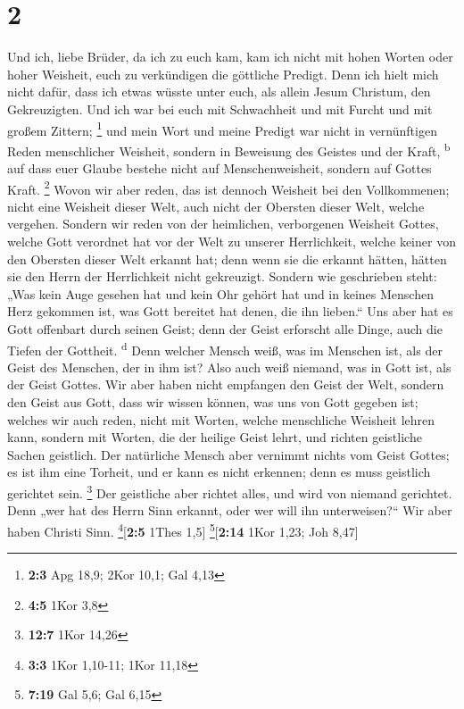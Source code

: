 \hypertarget{section-1}{%
\section{2}\label{section-1}}

 Und ich, liebe Brüder, da ich zu euch kam, kam ich nicht
mit hohen Worten oder hoher Weisheit, euch zu verkündigen die göttliche
Predigt.  Denn ich hielt mich nicht dafür, dass ich etwas
wüsste unter euch, als allein Jesum Christum, den Gekreuzigten.
 Und ich war bei euch mit Schwachheit und mit Furcht und
mit großem Zittern; \footnote{\textbf{2:3} Apg 18,9; 2Kor 10,1; Gal 4,13}
 und mein Wort und meine Predigt war nicht in vernünftigen
Reden menschlicher Weisheit, sondern in Beweisung des Geistes und der
Kraft, \textsuperscript{b}  auf dass euer Glaube bestehe
nicht auf Menschenweisheit, sondern auf Gottes Kraft. \footnote{\textbf{4:5}
  1Kor 3,8}  Wovon wir aber reden, das ist dennoch
Weisheit bei den Vollkommenen; nicht eine Weisheit dieser Welt, auch
nicht der Obersten dieser Welt, welche vergehen.  Sondern
wir reden von der heimlichen, verborgenen Weisheit Gottes, welche Gott
verordnet hat vor der Welt zu unserer Herrlichkeit, 
welche keiner von den Obersten dieser Welt erkannt hat; denn wenn sie
die erkannt hätten, hätten sie den Herrn der Herrlichkeit nicht
gekreuzigt.  Sondern wie geschrieben steht: „Was kein Auge
gesehen hat und kein Ohr gehört hat und in keines Menschen Herz gekommen
ist, was Gott bereitet hat denen, die ihn lieben.``  Uns
aber hat es Gott offenbart durch seinen Geist; denn der Geist erforscht
alle Dinge, auch die Tiefen der Gottheit. \textsuperscript{d}
 Denn welcher Mensch weiß, was im Menschen ist, als der
Geist des Menschen, der in ihm ist? Also auch weiß niemand, was in Gott
ist, als der Geist Gottes.  Wir aber haben nicht
empfangen den Geist der Welt, sondern den Geist aus Gott, dass wir
wissen können, was uns von Gott gegeben ist;  welches wir
auch reden, nicht mit Worten, welche menschliche Weisheit lehren kann,
sondern mit Worten, die der heilige Geist lehrt, und richten geistliche
Sachen geistlich.  Der natürliche Mensch aber vernimmt
nichts vom Geist Gottes; es ist ihm eine Torheit, und er kann es nicht
erkennen; denn es muss geistlich gerichtet sein. \footnote{\textbf{12:7}
  1Kor 14,26}  Der geistliche aber richtet alles, und
wird von niemand gerichtet.  Denn „wer hat des Herrn Sinn
erkannt, oder wer will ihn unterweisen?{}`` Wir aber haben Christi Sinn.
\footnote{\textbf{3:3} 1Kor 1,10-11; 1Kor 11,18}{[}\textbf{2:5} 1Thes
1,5{]} \footnote{\textbf{7:19} Gal 5,6; Gal 6,15}{[}\textbf{2:14} 1Kor
1,23; Joh 8,47{]}


